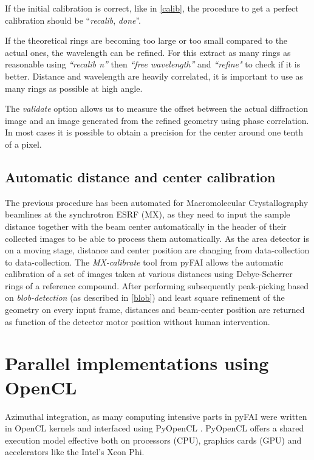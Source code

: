 \documentclass[preprint]{iucr}
\begin{document}
If the initial calibration is correct, like in \ref{calib}, the procedure
to get a perfect calibration should be ``\textit{recalib}, \textit{done}''.

If the theoretical rings are becoming too large or too small compared to the
actual ones, the wavelength can be refined. For this extract as many rings as
reasonable using \textit{``recalib n''} then \textit{``free wavelength''} and
\textit{``refine"} to check if it is better.
Distance and wavelength are
heavily correlated, it is important to use as many rings as possible at high angle.

The \textit{validate} option allows us to measure the offset between the actual
diffraction image and an image generated from the refined geometry using phase
correlation. In most cases it is possible to obtain a precision for the
center around one tenth of a pixel.

\subsection{Automatic distance and center calibration}
The previous procedure has been automated for Macromolecular Crystallography
beamlines at the synchrotron ESRF (MX), as they need to input the sample
distance together  with the beam center automatically in the header of their
collected images to be able to process them automatically.
As the area detector is on a moving stage, distance and center position are
changing from data-collection to data-collection.
The \textit{MX-calibrate} tool from pyFAI allows the automatic calibration of
a set of images taken at various distances using Debye-Scherrer rings of a
reference compound.
After performing subsequently peak-picking based on \textit{blob-detection}
(as described in \ref{blob}) and least square refinement of the geometry on
every input frame, distances and beam-center position are returned as function
of the detector motor position without human intervention.

\section{Parallel implementations using OpenCL}
Azimuthal integration, as  many computing intensive parts in pyFAI were written
in OpenCL kernels and interfaced using PyOpenCL \cite{pyopencl}. PyOpenCL offers a
shared execution model effective both on processors (CPU), graphics cards (GPU)
and accelerators like the Intel's Xeon Phi.
\end{document}
